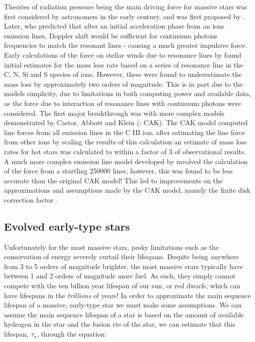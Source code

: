 Theories of radiation pressure being the main driving force for massive stars was first considered by astronomers in the early  century, and was first proposed by \textcite{sahaRadiationPressureQuantumTheory1919}.
Later, \textcite{milnePossibilityEmissionHighspeed1926} who predicted that after an initial acceleration phase from an ions emission lines, Doppler shift would be sufficient for continuum photons frequencies to match the resonant lines - causing a much greater impulsive force.
Early calculations of the force on stellar winds due to resonance lines by \textcite{lucy_mass_1970} found initial estimates for the mass loss rate based on a series of resonance line in the C, N, Si and S species of ions.
However, these were found to underestimate the mass loss by approximately two orders of magnitude.
This is in part due to the models simplicity, due to limitations in both computing power and available data, as the force due to interaction of resonance lines with continuum photons were considered.
The first major breakthrough was with more complex models demonstrated by Castor, Abbott and Klein (\citeyear{castor_radiation-driven_1975}; CAK).
The CAK model computed line forces from all emission lines in the C III ion, after estimating the line force from other ions by scaling the results of this calculation an estimate of mass loss rates for hot stars was calculated to within a factor of 3 of observational results.
A much more complex emission line model developed by \textcite{1982ApJ...259..282A} involved the calculation of the force from a startling \num{250000} lines, however, this was found to be less accurate than the original CAK model!
This led to improvements on the approximations and assumptions made by the CAK model, namely the finite disk correction factor
\parencite{friend_theory_1986,pauldrachRadiationdrivenWindsHot1986}.

\subsection{Evolved early-type stars}
\label{sec:evolvedstars}
Unfortunately for the most massive stars, pesky limitations such as the conservation of energy severely curtail their lifespans.
Despite being anywhere from 3 to 5 orders of magnitude brighter, the most massive stars typically have between 1 and 2 orders of magnitude more fuel.
As such, they simply cannot compete with the ten billion year lifespan of our sun, or red dwarfs, which can have lifespans in the \emph{trillions} of years!
In order to approximate the main sequence lifespan of a massive, early-type star we must make some assumptions.
We can assume the main sequence lifespan of a star is based on the amount of available hydrogen in the star and the fusion rte of the star, we can estimate that this lifespan, $\tau_\star$, through the equation:

